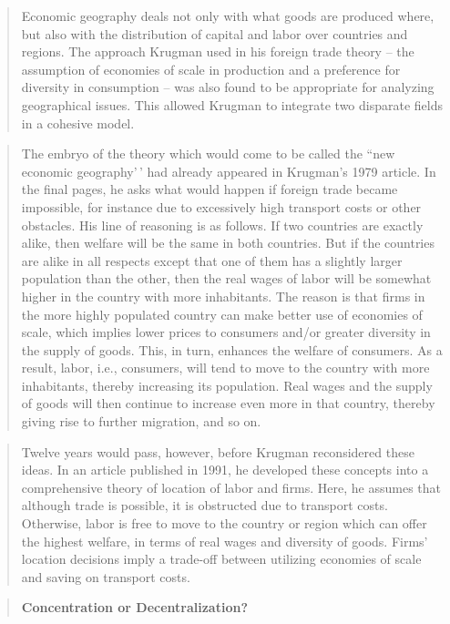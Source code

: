 \documentclass[
  12pt,
  oneside]{book}
\theoremstyle{definition}
\theoremstyle{definition}
\theoremstyle{definition}
\theoremstyle{definition}
\theoremstyle{remark}
\begin{document}
\begin{quote}
Economic geography deals not only with what goods are produced where, but also with the distribution of capital and labor over countries and regions. The approach Krugman used in his foreign trade theory -- the assumption of economies of scale in production and a preference for diversity in consumption -- was also found to be appropriate for analyzing geographical issues. This allowed Krugman to integrate two disparate fields in a cohesive model.
\end{quote}

\begin{quote}
The embryo of the theory which would come to be called the ``new economic geography'\,' had already appeared in Krugman's 1979 article. In the final pages, he asks what would happen if foreign trade became impossible, for instance due to excessively high transport costs or other obstacles. His line of reasoning is as follows. If two countries are exactly alike, then welfare will be the same in both countries. But if the countries are alike in all respects except that one of them has a slightly larger population than the other, then the real wages of labor will be somewhat higher in the country with more inhabitants. The reason is that firms in the more highly populated country can make better use of economies of scale, which implies lower prices to consumers and/or greater diversity in the supply of goods. This, in turn, enhances the welfare of consumers. As a result, labor, i.e., consumers, will tend to move to the country with more inhabitants, thereby increasing its population. Real wages and the supply of goods will then continue to increase even more in that country, thereby giving rise to further migration, and so on.
\end{quote}

\begin{quote}
Twelve years would pass, however, before Krugman reconsidered these ideas. In an article published in 1991, he developed these concepts into a comprehensive theory of location of labor and firms. Here, he assumes that although trade is possible, it is obstructed due to transport costs. Otherwise, labor is free to move to the country or region which can offer the highest welfare, in terms of real wages and diversity of goods. Firms' location decisions imply a trade-off between utilizing economies of scale and saving on transport costs.
\end{quote}

\begin{quote}
\textbf{Concentration or Decentralization?}
\end{quote}
\end{document}

